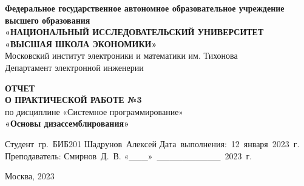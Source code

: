 
\begin{titlepage}
        \begin{center}

            \timesfont
            {\large\bf\timesfont Федеральное‌ ‌государственное‌ ‌автономное‌ ‌образовательное‌ ‌учреждение‌ ‌высшего‌ образования\\}
            {\large\bf\timesfont «НАЦИОНАЛЬНЫЙ‌ ‌ИССЛЕДОВАТЕЛЬСКИЙ‌ ‌УНИВЕРСИТЕТ‌ «ВЫСШАЯ‌ ‌ШКОЛА‌ ‌ЭКОНОМИКИ»‌\\}
            Московский‌ ‌институт‌ ‌электроники‌ ‌и‌ ‌математики‌ ‌им. Тихонова‌\\
            Департамент‌ ‌электронной‌ ‌инженерии‌\\

            \vfill
            \vfill

            {\bf\timesfont ОТЧЕТ \\
                О ПРАКТИЧЕСКОЙ РАБОТЕ №3}\\
            по дисциплине «Системное программирование»\\
            {\bf\timesfont «Основы дизассемблирования»}\\


            \vfill
            \vfill
            \vfill

            \hfill\vbox
            {
                \hbox{Студент гр. БИБ201}
                \hbox{Шадрунов Алексей}
                \hbox{Дата выполнения: 12 января 2023 г.}
                \hbox{}
                \hbox{Преподаватель:}
                \hbox{Смирнов Д. В.}
                \hbox{«\_\_\_» \_\_\_\_\_\_\_\_\_\_ 2023 г.}
            }

            \vfill

            Москва, 2023
        \end{center}
\end{titlepage}
